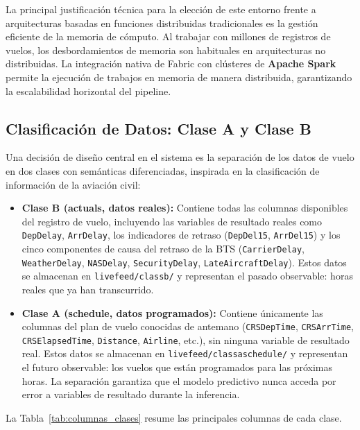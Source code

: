 \documentclass[12pt,oneside,a4paper]{report}
\renewcommand{\_}{\textunderscore\allowbreak}
\begin{document}
La principal justificación técnica para la elección de este entorno frente a arquitecturas basadas en funciones distribuidas tradicionales es la gestión eficiente de la memoria de cómputo. Al trabajar con millones de registros de vuelos, los desbordamientos de memoria son habituales en arquitecturas no distribuidas. La integración nativa de Fabric con clústeres de \textbf{Apache Spark} permite la ejecución de trabajos en memoria de manera distribuida, garantizando la escalabilidad horizontal del pipeline.

\subsection{Clasificación de Datos: Clase A y Clase B}
\label{sub:clases_datos}

Una decisión de diseño central en el sistema es la separación de los datos de vuelo en dos clases con semánticas diferenciadas, inspirada en la clasificación de información de la aviación civil:

\begin{itemize}
    \item \textbf{Clase B (actuals, datos reales):} Contiene todas las columnas disponibles del registro de vuelo, incluyendo las variables de resultado reales como \texttt{DepDelay}, \texttt{ArrDelay}, los indicadores de retraso (\texttt{DepDel15}, \texttt{ArrDel15}) y los cinco componentes de causa del retraso de la BTS (\texttt{CarrierDelay}, \texttt{WeatherDelay}, \texttt{NASDelay}, \texttt{SecurityDelay}, \texttt{LateAircraftDelay}). Estos datos se almacenan en \texttt{live\_feed/class\_b/} y representan el pasado observable: horas reales que ya han transcurrido.
    \item \textbf{Clase A (schedule, datos programados):} Contiene únicamente las columnas del plan de vuelo conocidas de antemano (\texttt{CRSDepTime}, \texttt{CRSArrTime}, \texttt{CRSElapsedTime}, \texttt{Distance}, \texttt{Airline}, etc.), sin ninguna variable de resultado real. Estos datos se almacenan en \texttt{live\_feed/class\_a\_schedule/} y representan el futuro observable: los vuelos que están programados para las próximas horas. La separación garantiza que el modelo predictivo nunca acceda por error a variables de resultado durante la inferencia.
\end{itemize}

La Tabla~\ref{tab:columnas_clases} resume las principales columnas de cada clase.
\end{document}

